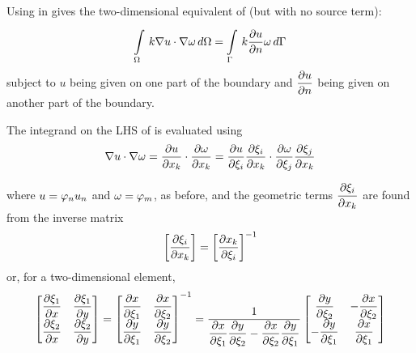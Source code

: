Using  in  gives the 
two-dimensional equivalent of  
(but with no source term):
\begin{equation}
     \displaystyle\int\limits_{\Omega}^{} \,k \nabla u\cdot\nabla \omega\,d\Omega  
  =    \displaystyle\int\limits_{\Gamma}^{} \,k  \dfrac{\partial u}{\partial n} \omega\,d\Gamma  
  \label{eqn:2-D_equiv}
\end{equation}
subject to $u$ being given on one part of the boundary and $ \dfrac{\partial u}{\partial n} $
being given on another part of the boundary.

The integrand on the LHS of  is evaluated using
\begin{equation}
  \nabla u\cdot\nabla \omega =  \dfrac{\partial u}{\partial x_{k}} \cdot \dfrac{\partial \omega}{\partial x_{k}}  = 
   \dfrac{\partial u}{\partial \xi_{i}}   \dfrac{\partial \xi_{i}}{\partial x_{k}} \cdot \dfrac{\partial \omega}{\partial \xi_{j}}  
   \dfrac{\partial \xi_{j}}{\partial x_{k}} 
  \label{eqn:integrand}
\end{equation}
        
where $u= \varphi_{n} u_{n}$ and $\omega= \varphi_{m} $, as before, and the geometric terms
$ \dfrac{\partial \xi_{i}}{\partial x_{k}} $ are found from the inverse matrix
\begin{equation*}
  \left[  \dfrac{\partial \xi_{i}}{\partial x_{k}}  \right]=\left[  \dfrac{\partial x_{k}}{\partial \xi_{i}}  \right]^{-1} 
\end{equation*} 
or, for a two-dimensional element,
\begin{equation*}
  \begin{bmatrix}
     \dfrac{\partial \xi_{1}}{\partial x}  &  \dfrac{\partial \xi_{1}}{\partial y}  \\
     \dfrac{\partial \xi_{2}}{\partial x}  &  \dfrac{\partial \xi_{2}}{\partial y} 
  \end{bmatrix} =
  \begin{bmatrix}
     \dfrac{\partial x}{\partial \xi_{1}}  &  \dfrac{\partial x}{\partial \xi_{2}}  \\
     \dfrac{\partial y}{\partial \xi_{1}}  &  \dfrac{\partial y}{\partial \xi_{2}} 
  \end{bmatrix}^{-1} =
  \dfrac{1}{ \dfrac{\partial x}{\partial \xi_1}  \dfrac{\partial y}{\partial \xi_2} -  \dfrac{\partial x}{\partial \xi_2}  \dfrac{\partial y}{\partial \xi_1} }
  \begin{bmatrix}
     \dfrac{\partial y}{\partial \xi_{2}}  & - \dfrac{\partial x}{\partial \xi_{2}} \\
    - \dfrac{\partial y}{\partial \xi_{1}}  &  \dfrac{\partial x}{\partial \xi_{1}} 
  \end{bmatrix}
\end{equation*}




